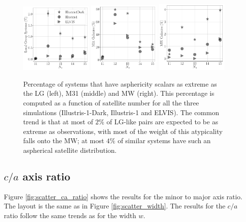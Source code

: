 \documentclass[a4paper,fleqn,usenatbib]{mnras}
\begin{document}
\begin{figure}
\centering
\includegraphics[width=0.32\textwidth]{LG_numbers.pdf}
\includegraphics[width=0.32\textwidth]{M31_numbers.pdf}
\includegraphics[width=0.32\textwidth]{MW_numbers.pdf}
\caption{
Percentage of systems that have asphericity scalars as extreme as the
LG (left), M31 (middle) and MW (right).  
This percentage is computed as a function of satellite number for all
the three simulations (Illustris-1-Dark, Illustris-1 and ELVIS).
The common trend is that at most of $2\%$ of LG-like pairs are expected to
be as extreme as observations, with most of the weight of this
atypicality falls onto the MW; at most $4\%$ of similar systems have
such an aspherical satellite distribution. 
\label{fig:expected_number}}
\end{figure}

\subsection{$c/a$ axis ratio}

Figure \ref{fig:scatter_ca_ratio} shows the results for the minor to
major axis ratio. 
The layout is the same as in Figure \ref{fig:scatter_width}.
The results for the $c/a$ ratio follow the same trends as for the
width $w$.
\end{document}
